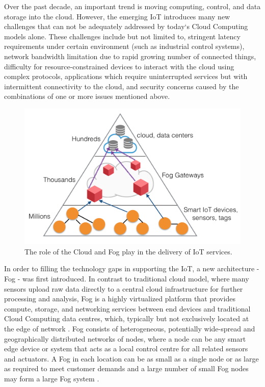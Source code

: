 Over the past decade, an important trend is moving computing, control, and data storage into the cloud. However, the emerging IoT introduces many new challenges that can not be adequately addressed by today`s Cloud Computing models alone. These challenges \cite{7498684} include but not limited to, stringent latency requirements under certain environment (such as industrial control systems), network bandwidth limitation due to rapid growing number of connected things, difficulty for resource-constrained devices to interact with the cloud using complex protocols, applications which require uninterrupted services but with intermittent connectivity to the cloud, and security concerns caused by the combinations of one or more issues mentioned above.

\begin{figure}[!htbp]
\centering
\includegraphics[scale = 0.55]{fog_computing.png}
\caption{The role of the Cloud and Fog play in the delivery of IoT services. \cite{7123563}} 
\label{fig:fog_computing}
\end{figure}

In order to filling the technology gaps in supporting the IoT, a new architecture - Fog - was first introduced. In contrast to traditional cloud model, where many sensors upload raw data directly to a central cloud infrastructure for further processing and analysis, Fog is a highly virtualized platform that provides compute, storage, and networking services between end devices and traditional Cloud Computing data centres, which, typically but not exclusively located at the edge of network \cite{Bonomi:2012:FCR:2342509.2342513}.  Fog consists of heterogeneous, potentially wide-spread and geographically distributed networks of nodes, where a node can be any smart edge device or system that acts as a local control centre for all related sensors and actuators. A Fog in each location can be as small as a single node or as large as required to meet customer demands and a large number of small Fog nodes may form a large Fog system \cite{7498684}. 

